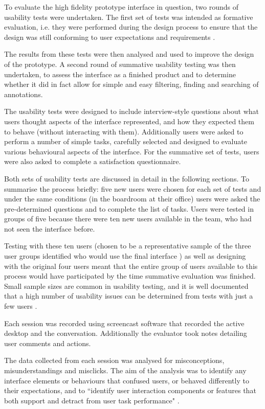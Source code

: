 To evaluate the high fidelity prototype interface in question, two rounds of usability tests were undertaken. The first set of tests was intended as formative evaluation, i.e. they were performed during the design process to ensure that the design was still conforming to user expectations and requirements \citep[p. 437]{RogersPreece}.

The results from these tests were then analysed and used to improve the design of the prototype. A second round of summative usability testing was then undertaken, to assess the interface as a finished product and to determine whether it did in fact allow for simple and easy filtering, finding and searching of annotations. 

The usability tests were designed to include interview-style questions about what users thought aspects of the interface represented, and how they expected them to behave (without interacting with them). Additionally users were asked to perform a number of simple tasks, carefully selected and designed to evaluate various behavioural aspects of the interface. For the summative set of tests, users were also asked to complete a satisfaction questionnaire. 

Both sets of usability tests are discussed in detail in the following sections. To summarise the process briefly: five new users were chosen for each set of tests and under the same conditions (in the boardroom at their office) users were asked the pre-determined questions and to complete the list of tasks. Users were tested in groups of five because there were ten new users available in the team, who had not seen the interface before. 

Testing with these ten users (chosen to be a representative sample of the three user groups identified who would use the final interface \citep[p. 461]{RogersPreece}) as well as designing with the original four users meant that the entire group of users available to this process would have participated by the time summative evaluation was finished. Small sample sizes are common in usability testing, and it is well documented that a high number of usability issues can be determined from tests with just a few users \citep[p. 119]{HackosRedish}.

Each session was recorded using screencast software that recorded the active desktop and the conversation. Additionally the evaluator took notes detailing user comments and actions. 

The data collected from each session was analysed for misconceptions, misunderstandings and misclicks. The aim of the analysis was to identify any interface elements or behaviours that confused users, or behaved differently to their expectations, and to ``identify user interaction components or features that both support and detract from user task performance" \citep{GabbardHix}.

